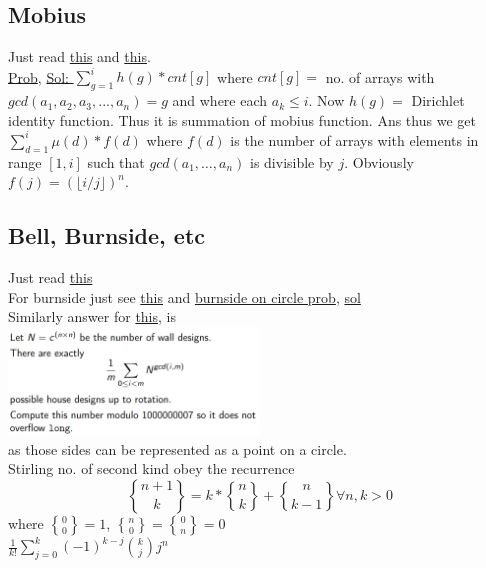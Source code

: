 \documentclass[8pt, a4paper, oneside, twocolumn]{extarticle}
\DeclareRobustCommand{\stirling}{\genfrac\{\}{0pt}{}}
\begin{document}
\subsection{Mobius}
Just read \href{https://github.com/sourabh2311/Competitive-Programming/blob/master/Reference%20Notes/Multiplicative.pdf}{this} and \href{https://www.quora.com/profile/Surya-Kiran/Posts/A-Dance-with-Mobius-Function}{this}.
\\\href{https://codeforces.com/contest/915/problem/G}{Prob}, \href{https://github.com/sourabh2311/Competitive-Programming/blob/master/CF/ER36/G.cpp}{Sol: }$\sum_{g = 1}^{i}h(g)*cnt[g]$ where $cnt[g] = $ no. of arrays with $gcd(a_1, a_2, a_3, ..., a_n) = g$ and where each $a_k \leq i$. Now $h(g) = $ Dirichlet identity function. Thus it is summation of mobius function. Ans thus we get $\sum_{d = 1}^{i}\mu(d)*f(d)$ where $f(d)$ is the number of arrays with elements in range $[1, i]$ such that $gcd(a_1, \dots, a_n)$ is divisible by $j$. Obviously $f(j) = (\lfloor i/j \rfloor)^n$.
\subsection{Bell, Burnside, etc}
Just read \href{https://github.com/sourabh2311/Competitive-Programming/blob/master/Reference%20Notes/cgt.pdf}{this}
\\For burnside just see \href{https://codeforces.com/blog/entry/62401}{this} and \href{http://poj.org/problem?id=1286}{burnside on circle prob}, \href{https://github.com/sourabh2311/Competitive-Programming/blob/master/IMP%20QUES/BURNSIDE/2.CPP}{sol}
\\Similarly answer for \href{http://gcpc.nwerc.eu/problemset_2017.pdf}{this}, is \\\includegraphics[width=0.5\textwidth,height=0.5\textheight,keepaspectratio]{brnsq}
\\as those sides can be represented as a point on a circle.
\\Stirling no. of second kind obey the recurrence $$\stirling{n + 1}{k} = k * \stirling{n}{k} + \stirling{n}{k - 1} \forall n, k > 0$$ where $\stirling{0}{0} = 1$, $\stirling{n}{0} = \stirling{0}{n} = 0$
\\$\frac{1}{k!}\sum_{j=0}^{k}(-1)^{k-j}\binom{k}{j}j^n$
\end{document}
